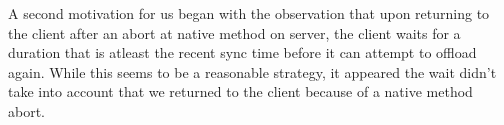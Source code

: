 A second motivation for us began with the observation that upon returning to the client
after an abort at native method on server, the client waits for a duration that is 
atleast the recent sync time before it can attempt to offload again. While this 
seems to be a reasonable strategy, it appeared the wait didn't take into account 
that we returned to the client because of a native method abort.  

